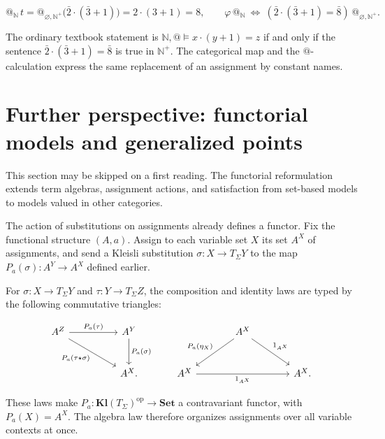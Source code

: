 \documentclass[11pt]{article}
\makeatletter
\newcommand{\atsign}{\mathord{@}}
\theoremstyle{definition}
\makeatother
\begin{document}
\[
\atsign_{\mathbb N}\,t
=\atsign_{\varnothing,\mathbb N^+}\bigl(\bar2\cdot(\bar3+1)\bigr)
=2\cdot(3+1)=8,
\qquad
\varphi\,\atsign_{\mathbb N}
\ \Longleftrightarrow\ 
(\bar2\cdot(\bar3+1)=\bar8)\,\atsign_{\varnothing,\mathbb N^+}.
\]

The ordinary textbook statement is
\(\mathbb N,\atsign\models x\cdot(y+1)=z\) if and only if the sentence
\(\bar2\cdot(\bar3+1)=\bar8\) is true in \(\mathbb N^+\). The categorical
map and the \(\atsign\)-calculation express the same replacement of an
assignment by constant names.

\section{Further perspective: functorial models and generalized points}
\label{functorial-models}

This section may be skipped on a first reading. The functorial reformulation
extends term algebras, assignment actions, and satisfaction from set-based
models to models valued in other categories.

The action of substitutions on assignments already defines a functor. Fix the
functional structure \((A,a)\). Assign to each variable set \(X\) its set
\(A^X\) of assignments, and send a Kleisli substitution
\(\sigma:X\to T_\Sigma Y\) to the map
\(P_a(\sigma):A^Y\to A^X\) defined earlier.

For
\(\sigma:X\to T_\Sigma Y\) and \(\tau:Y\to T_\Sigma Z\), the composition
and identity laws are typed by the following commutative triangles:

\[
\begin{tikzcd}[row sep=large,column sep=huge]
A^Z \arrow[r,"P_a(\tau)"]
  \arrow[dr,"P_a(\tau\star\sigma)"'] &
A^Y \arrow[d,"P_a(\sigma)"] \\
& A^X.
\end{tikzcd}
\qquad
\begin{tikzcd}[row sep=large,column sep=large]
& A^X \arrow[dl,"P_a(\eta_X)"'] \arrow[dr,"1_{A^X}"] & \\
A^X \arrow[rr,"1_{A^X}"'] && A^X.
\end{tikzcd}
\]

These laws make
\(P_a:\mathbf{Kl}(T_\Sigma)^{\mathrm{op}}\to\mathbf{Set}\) a contravariant
functor, with
\(P_a(X)=A^X\). The algebra law therefore organizes assignments over all
variable contexts at once.
\end{document}
